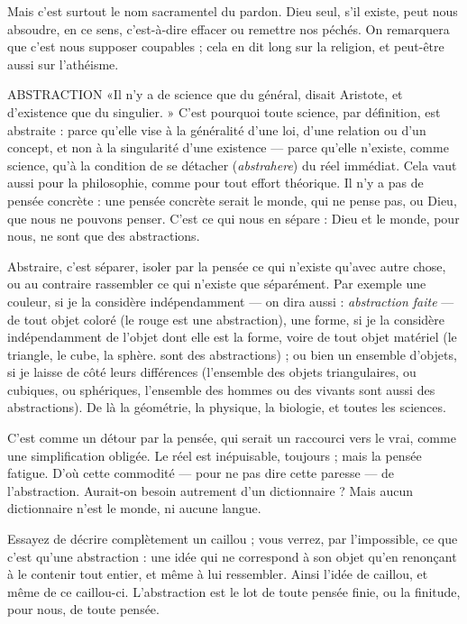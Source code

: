 Mais c’est surtout le nom sacramentel du pardon. Dieu seul, s’il existe, peut
nous absoudre, en ce sens, c’est-à-dire effacer ou remettre nos péchés. On
remarquera que c’est nous supposer coupables ; cela en dit long sur la religion,
et peut-être aussi sur l’athéisme.

ABSTRACTION «Il n’y a de science que du général, disait Aristote, et d’existence
que du singulier. » C’est pourquoi toute science, par
définition, est abstraite : parce qu’elle vise à la généralité d’une loi, d’une relation
ou d’un concept, et non à la singularité d’une existence — parce qu’elle
n'existe, comme science, qu’à la condition de se détacher ({\it abstrahere}) du réel
immédiat. Cela vaut aussi pour la philosophie, comme pour tout effort théorique.
Il n’y a pas de pensée concrète : une pensée concrète serait le monde, qui
ne pense pas, ou Dieu, que nous ne pouvons penser. C’est ce qui nous en
sépare : Dieu et le monde, pour nous, ne sont que des abstractions.

Abstraire, c’est séparer, isoler par la pensée ce qui n’existe qu'avec autre
chose, ou au contraire rassembler ce qui n'existe que séparément. Par exemple
une couleur, si je la considère indépendamment — on dira aussi : {\it abstraction
faite} — de tout objet coloré (le rouge est une abstraction), une forme, si je la
considère indépendamment de l’objet dont elle est la forme, voire de tout objet
matériel (le triangle, le cube, la sphère. sont des abstractions) ; ou bien un
ensemble d’objets, si je laisse de côté leurs différences (l’ensemble des objets
triangulaires, ou cubiques, ou sphériques, l'ensemble des hommes ou des
vivants sont aussi des abstractions). De là la géométrie, la physique, la biologie,
et toutes les sciences.

C’est comme un détour par la pensée, qui serait un raccourci vers le vrai,
comme une simplification obligée. Le réel est inépuisable, toujours ; mais la
pensée fatigue. D’où cette commodité — pour ne pas dire cette paresse — de
l’abstraction. Aurait-on besoin autrement d’un dictionnaire ? Mais aucun dictionnaire
n’est le monde, ni aucune langue.

Essayez de décrire complètement un caillou ; vous verrez, par l'impossible,
ce que c’est qu’une abstraction : une idée qui ne correspond à son objet qu’en
renonçant à le contenir tout entier, et même à lui ressembler. Ainsi l’idée de
caillou, et même de ce caillou-ci. L’abstraction est le lot de toute pensée finie,
ou la finitude, pour nous, de toute pensée.

